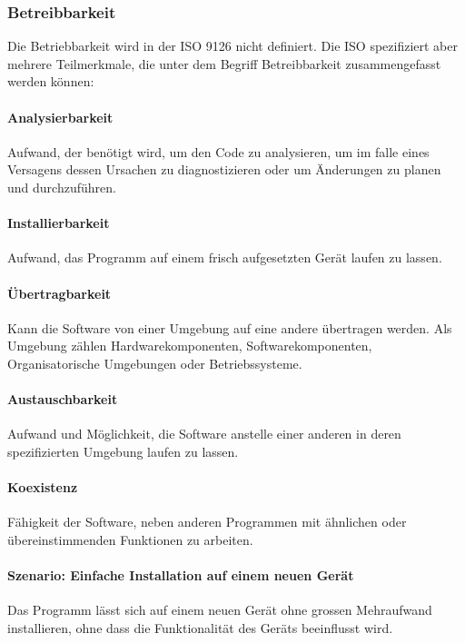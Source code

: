 \documentclass[]{subfiles}
\begin{document}
	\subsubsection{Betreibbarkeit}
	Die Betriebbarkeit wird in der ISO 9126 nicht definiert. Die ISO spezifiziert aber mehrere Teilmerkmale, die unter dem Begriff Betreibbarkeit zusammengefasst werden können:

		\paragraph{Analysierbarkeit}
		Aufwand, der benötigt wird, um den Code zu analysieren, um im falle eines Versagens dessen Ursachen zu diagnostizieren oder um Änderungen zu planen und durchzuführen.

		\paragraph{Installierbarkeit}
		Aufwand, das Programm auf einem frisch aufgesetzten Gerät laufen zu lassen.

		\paragraph{Übertragbarkeit}
		Kann die Software von einer Umgebung auf eine andere übertragen werden. 
		Als Umgebung zählen Hardwarekomponenten, Softwarekomponenten, Organisatorische Umgebungen oder Betriebssysteme. 

		\paragraph{Austauschbarkeit}
		Aufwand und Möglichkeit, die Software anstelle einer anderen in deren spezifizierten Umgebung laufen zu lassen.

		\paragraph{Koexistenz}
		Fähigkeit der Software, neben anderen Programmen mit ähnlichen oder übereinstimmenden Funktionen zu arbeiten.

		\paragraph{Szenario: Einfache Installation auf einem neuen Gerät}
		Das Programm lässt sich auf einem neuen Gerät ohne grossen Mehraufwand installieren, ohne dass die Funktionalität des Geräts beeinflusst wird.
		
\end{document}
